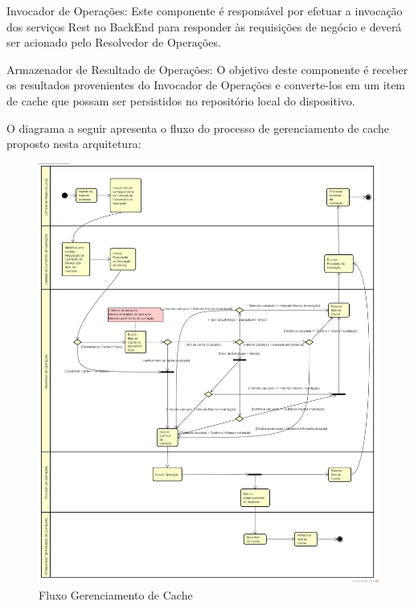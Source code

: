 \documentclass[
	article,			%
	11pt,				%
	oneside,			%
	a4paper,			%
	english,			%
	brazil,				%
	sumario=tradicional
]{abntex2}
\begin{document}
\begin{description}
 	\item Invocador de Operações:
 	Este componente é responsável por efetuar a invocação dos serviços Rest no BackEnd para responder às requisições de negócio e deverá ser acionado pelo Resolvedor de Operações.
 	
 	\item Armazenador de Resultado de Operações:
 	O objetivo deste componente é receber os resultados provenientes do Invocador de Operações e converte-los em um item de cache que possam ser persistidos no repositório local do dispositivo.
 	
 \end{description}

O diagrama a seguir apresenta o fluxo do processo de gerenciamento de cache proposto nesta arquitetura:

\begin{figure}[H]
	\centering
	\includegraphics[scale=0.36]{images/FluxoGerenciamentodeCache}
	\caption{Fluxo Gerenciamento de Cache}
\end{figure}
\end{document}
